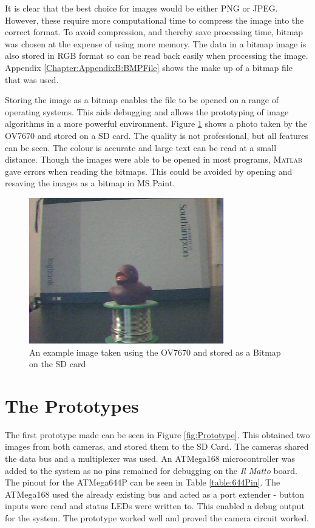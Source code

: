 It is clear that the best choice for images would be either PNG or JPEG. However, these require more computational time to compress the image into the correct format. To avoid compression, and thereby save processing time, bitmap was chosen at the expense of using more memory. The data in a bitmap image is also stored in RGB format so can be read back easily when processing the image. Appendix \ref{Chapter:AppendixB:BMPFile} shows the make up of a bitmap file that was used.


Storing the image as a bitmap enables the file to be opened on a range of operating systems. This aids debugging and allows the prototyping of image algorithms in a more powerful environment. Figure \ref{ExampleImage} shows a photo taken by the OV7670 and stored on a SD card. The quality is not professional, but all features can be seen. The colour is accurate and large text can be read at a small distance. Though the images were able to be opened in most programs, \textsc{Matlab} gave errors when reading the bitmaps. This could be avoided by opening and resaving the images as a bitmap in MS Paint.


\begin{figure}
\begin{center}
\includegraphics{Figures/ExampleImageFromCamera.jpg} 
\end{center}
\caption{An example image taken using the OV7670 and stored as a Bitmap on the SD card}
\label{ExampleImage}
\end{figure}

\section{The Prototypes}

The first prototype made can be seen in Figure \ref{fig:Prototype}. This obtained two images from both cameras, and stored them to the SD Card. The cameras shared the data bus and a \itc multiplexer was used. An ATMega168 microcontroller was added to the system as no pins remained for debugging on the \textit{Il Matto} board. The pinout for the ATMega644P can be seen in Table \ref{table:644Pin}. The ATMega168 used the already existing \itc bus and acted as a port extender - button inputs were read and status LEDs were written to. This enabled a debug output for the system. The prototype worked well and proved the camera circuit worked. 

